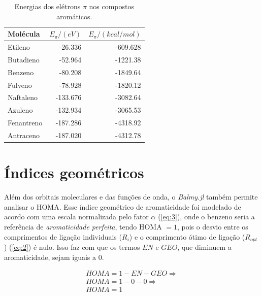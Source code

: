 \begin{table}[htb]
	\centering
	\caption{\label{tab:energies} Energias dos elétrons $\pi$ nos compostos aromáticos.}	
	\begin{tabular}{lrr}
		\toprule
		\textbf{Molécula} & $E_\pi / (eV)$ & $E_\pi / (kcal/mol)$
		\\ 
		\midrule
        Etileno & -26.336 & -609.628 \\
        Butadieno & -52.964 & -1221.38 \\
        Benzeno & -80.208 & -1849.64 \\
        Fulveno & -78.928 & -1820.12 \\
        Naftaleno & -133.676 & -3082.64 \\
        Azuleno & -132.934 & -3065.53 \\
        Fenantreno & -187.286 & -4318.92 \\
        Antraceno & -187.020 & -4312.78 \\
    \bottomrule
	\end{tabular}
\end{table}

\section{Índices geométricos}

Além dos orbitais moleculares e das funções de onda, o \textit{Balmy.jl} também permite analisar o \gls{HOMA}. Esse índice geométrico de aromaticidade foi modelado de acordo com uma escala normalizada pelo fator $\alpha$ (\autoref{eq:3}), onde o benzeno seria a referência de \textit{aromaticidade perfeita}, tendo \gls{HOMA} $=1$, pois o desvio entre os comprimentos de ligação individuais ($R_i$) e o comprimento ótimo de ligação ($R_{opt}$) (\autoref{eq:2}) é nulo. Isso faz com que os termos $EN$ e $GEO$, que diminuem a aromaticidade, sejam iguais a $0$.

\begin{equation}
\begin{split}
    HOMA = 1 - EN - GEO \Longrightarrow \\  HOMA = 1 - 0 - 0 \Longrightarrow \\  HOMA = 1
\end{split}
\end{equation}

